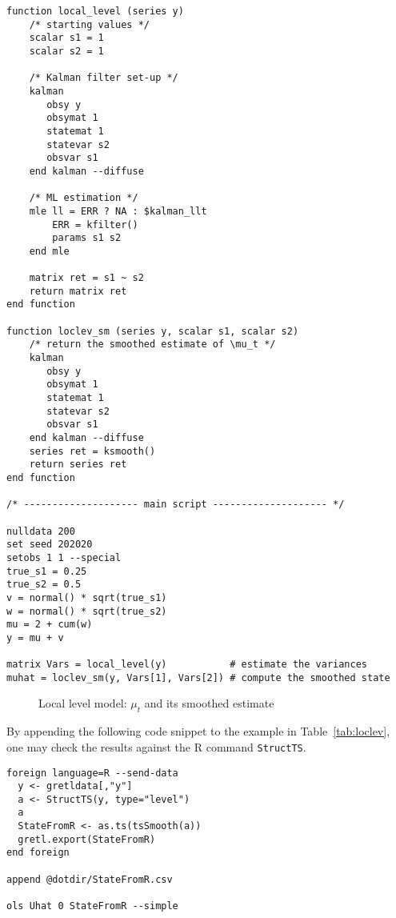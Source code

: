 \documentclass[a4paper]{article}
\begin{document}
\begin{table}[htbp]
  \caption{Local level model}
  \label{tab:loclev}

\begin{small}
\begin{verbatim}
function local_level (series y)
    /* starting values */
    scalar s1 = 1
    scalar s2 = 1

    /* Kalman filter set-up */
    kalman
       obsy y
       obsymat 1
       statemat 1
       statevar s2
       obsvar s1
    end kalman --diffuse

    /* ML estimation */
    mle ll = ERR ? NA : $kalman_llt
        ERR = kfilter()
        params s1 s2
    end mle

    matrix ret = s1 ~ s2
    return matrix ret
end function

function loclev_sm (series y, scalar s1, scalar s2)
    /* return the smoothed estimate of \mu_t */
    kalman
       obsy y
       obsymat 1
       statemat 1
       statevar s2
       obsvar s1
    end kalman --diffuse
    series ret = ksmooth()
    return series ret
end function

/* -------------------- main script -------------------- */

nulldata 200
set seed 202020
setobs 1 1 --special
true_s1 = 0.25
true_s2 = 0.5
v = normal() * sqrt(true_s1)
w = normal() * sqrt(true_s2)
mu = 2 + cum(w)
y = mu + v

matrix Vars = local_level(y)           # estimate the variances
muhat = loclev_sm(y, Vars[1], Vars[2]) # compute the smoothed state
\end{verbatim}
\end{small}
\end{table}

\begin{figure}[htbp]
  \centering
  \caption{Local level model: $\mu_t$ and its smoothed estimate}
  \label{fig:loclev}
\end{figure}
By appending the following code snippet to the example in
Table~\ref{tab:loclev}, one may check the results against the
\textsf{R} command \texttt{StructTS}.

\begin{verbatim}
foreign language=R --send-data
  y <- gretldata[,"y"]
  a <- StructTS(y, type="level")
  a
  StateFromR <- as.ts(tsSmooth(a))
  gretl.export(StateFromR)
end foreign

append @dotdir/StateFromR.csv

ols Uhat 0 StateFromR --simple
\end{verbatim}
\end{document}
